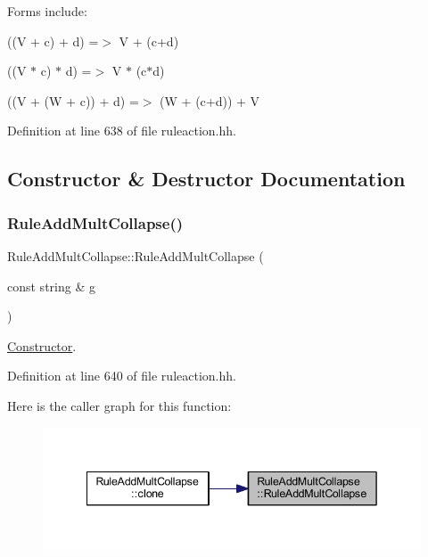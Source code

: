 Forms include\+:
\begin{DoxyItemize}
\item {\ttfamily ((V + c) + d) =$>$ V + (c+d)}
\item {\ttfamily ((V $\ast$ c) $\ast$ d) =$>$ V $\ast$ (c$\ast$d)}
\item {\ttfamily ((V + (W + c)) + d) =$>$ (W + (c+d)) + V} 
\end{DoxyItemize}

Definition at line 638 of file ruleaction.\+hh.



\subsection{Constructor \& Destructor Documentation}
\mbox{\label{class_rule_add_mult_collapse_a93b4e7fcaa8b74044b67b93766a7888f}} 
\subsubsection{\texorpdfstring{RuleAddMultCollapse()}{RuleAddMultCollapse()}}
{\footnotesize\ttfamily Rule\+Add\+Mult\+Collapse\+::\+Rule\+Add\+Mult\+Collapse (\begin{DoxyParamCaption}\item[{const string \&}]{g }\end{DoxyParamCaption})\hspace{0.3cm}{\ttfamily [inline]}}



\mbox{\hyperlink{class_constructor}{Constructor}}. 



Definition at line 640 of file ruleaction.\+hh.

Here is the caller graph for this function\+:
\nopagebreak
\begin{figure}[H]
\begin{center}
\leavevmode
\includegraphics[width=342pt]{class_rule_add_mult_collapse_a93b4e7fcaa8b74044b67b93766a7888f_icgraph}
\end{center}
\end{figure}


